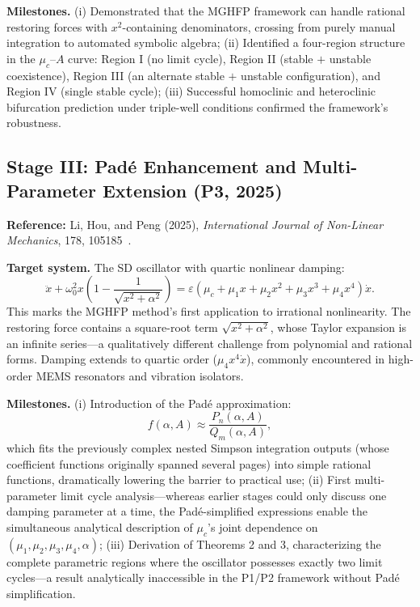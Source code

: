 \documentclass[11pt,a4paper]{article}
\begin{document}
\medskip
\noindent\textbf{Milestones.} (i) Demonstrated that the MGHFP framework can handle rational restoring forces with $x^2$-containing denominators, crossing from purely manual integration to automated symbolic algebra; (ii) Identified a four-region structure in the $\mu_c$--$A$ curve: Region I (no limit cycle), Region II (stable $+$ unstable coexistence), Region III (an alternate stable $+$ unstable configuration), and Region IV (single stable cycle); (iii) Successful homoclinic and heteroclinic bifurcation prediction under triple-well conditions confirmed the framework's robustness.

\subsection{Stage III: Pad\'e Enhancement and Multi-Parameter Extension (P3, 2025)}

\textbf{Reference:} Li, Hou, and Peng (2025), \textit{International Journal of Non-Linear Mechanics}, 178, 105185~\cite{P3}.

\medskip
\noindent\textbf{Target system.} The SD oscillator with quartic nonlinear damping:
\begin{equation}
\ddot{x} + \omega_0^2 x\!\left(1 - \frac{1}{\sqrt{x^2+\alpha^2}}\right) = \varepsilon(\mu_c + \mu_1 x + \mu_2 x^2 + \mu_3 x^3 + \mu_4 x^4)\dot{x}.
\label{eq:P3}
\end{equation}
This marks the MGHFP method's first application to irrational nonlinearity. The restoring force contains a square-root term $\sqrt{x^2+\alpha^2}$, whose Taylor expansion is an infinite series---a qualitatively different challenge from polynomial and rational forms. Damping extends to quartic order ($\mu_4 x^4\dot{x}$), commonly encountered in high-order MEMS resonators and vibration isolators.

\medskip
\noindent\textbf{Milestones.} (i) Introduction of the Pad\'e approximation:
\begin{equation}
f(\alpha, A) \approx \frac{P_n(\alpha, A)}{Q_m(\alpha, A)},
\label{eq:pade}
\end{equation}
which fits the previously complex nested Simpson integration outputs (whose coefficient functions originally spanned several pages) into simple rational functions, dramatically lowering the barrier to practical use; (ii) First multi-parameter limit cycle analysis---whereas earlier stages could only discuss one damping parameter at a time, the Pad\'e-simplified expressions enable the simultaneous analytical description of $\mu_c$'s joint dependence on $(\mu_1, \mu_2, \mu_3, \mu_4, \alpha)$; (iii) Derivation of Theorems 2 and 3, characterizing the complete parametric regions where the oscillator possesses exactly two limit cycles---a result analytically inaccessible in the P1/P2 framework without Pad\'e simplification.
\end{document}
